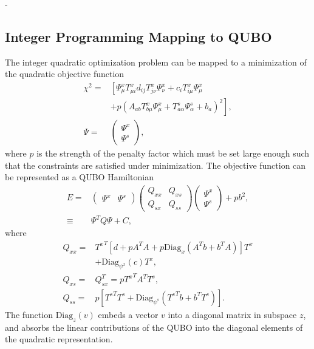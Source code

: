 -\documentclass[prd,twocolumn,tightenlines,preprintnumbers,showpacs,superscriptaddress,notitlepage,nofootinbib,eqsecnum,floatfix,longbibliography]{revtex4}
\begin{document}
\subsection{Integer Programming Mapping to QUBO}
\label{sec:methods:ilp}

The integer quadratic optimization problem can be mapped to a minimization of the quadratic objective function
\begin{align}
    \chi^2 = & \left[\Psi^x_{\mu} T^x_{\mu i}d_{ij} T^x_{j \nu}\Psi^x_\nu + c_i T^x_{i\mu} \Psi^x_\mu \right.
    \nonumber\\
    &\left.+ p (A_{a b} T^x_{b \mu} \Psi^x_{\mu} + T^s_{a \alpha} \Psi^s_\alpha + b_a)^2 \right],\\
    \Psi = & \begin{pmatrix}
    \Psi^x\\
    \Psi^s
    \end{pmatrix},
\end{align}
where $p$ is the strength of the penalty factor which must be set large enough such that the constraints are satisfied under minimization.
The objective function can be represented as a QUBO Hamiltonian
\begin{align}
    E = &
    \begin{pmatrix}
    \Psi^x & \Psi^s
    \end{pmatrix}
    \begin{pmatrix}
    Q_{xx} & Q_{xs}\\
    Q_{sx} & Q_{ss}
    \end{pmatrix}
    \begin{pmatrix}
    \Psi^x\\ \Psi^s
    \end{pmatrix} + pb^2,\\
    \equiv & \Psi^T Q \Psi + C,
    \label{eq:matrix_form}
\end{align}
where
\begin{align}
    Q_{xx} = & {T^{x}}^T \left[ d + p A^T A + p \mathrm{Diag}_{x} \left(A^T b + b^T A\right) \right] T^x \nonumber \\
    &+ \mathrm{Diag}_{\psi^x}(c) T^x,\\
    Q_{xs} = & Q_{sx}^T = p {T^{x}}^T A^T T^s,\\
    Q_{ss} = & p\left[ {T^{s}}^T T^s + \mathrm{Diag}_{\psi^s}\left( {T^{s}}^T b + b^T T^s\right) \right].
\end{align}
The function $\mathrm{Diag}_{z}(v)$ embeds a vector $v$ into a diagonal matrix in subspace $z$, and absorbs the linear contributions of the QUBO into the diagonal elements of the quadratic representation.
\end{document}
